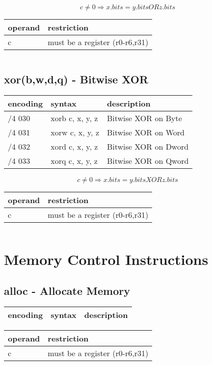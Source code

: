 \documentclass[letterpaper,10pt,openright,twoside,onecolumn]{book}
\begin{document}
  \begin{displaymath} c \neq 0 \Rightarrow x.bits = y.bits OR z.bits \end{displaymath}

  \flushleft
  \begin{tabular}{|l|l|}
   \hline
    operand & restriction \\
   \hline
    c & must be a register (r0-r6,r31) \\
   \hline
  \end{tabular}
  \begin{verbatim}
  \end{verbatim}

\newpage\subsection{xor(b,w,d,q) - Bitwise XOR}
  \begin{tabular}{|l|l|l|}
   \hline
    encoding & syntax & description \\
   \hline
    /4 030 & xorb c, x, y, z & Bitwise XOR on Byte \\
    /4 031 & xorw c, x, y, z & Bitwise XOR on Word \\
    /4 032 & xord c, x, y, z & Bitwise XOR on Dword \\
    /4 033 & xorq c, x, y, z & Bitwise XOR on Qword \\
   \hline
  \end{tabular}

  \begin{displaymath} c \neq 0 \Rightarrow x.bits = y.bits XOR z.bits\end{displaymath}

  \flushleft
  \begin{tabular}{|l|l|}
   \hline
    operand & restriction \\
   \hline
    c & must be a register (r0-r6,r31) \\
   \hline
  \end{tabular}
  \begin{verbatim}
  \end{verbatim}

\clearpage\section{Memory Control Instructions}
\subsection{alloc - Allocate Memory}
  \begin{tabular}{|l|l|l|}
   \hline
    encoding & syntax & description \\
   \hline
   \hline
  \end{tabular}
  \flushleft
  \begin{tabular}{|l|l|}
   \hline
    operand & restriction \\
   \hline
    c & must be a register (r0-r6,r31) \\
   \hline
  \end{tabular}
  \begin{verbatim}
  \end{verbatim}
\end{document}
